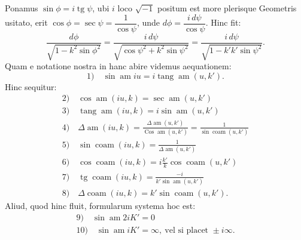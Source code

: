 \documentclass{article}
\begin{document}
Ponamus $\sin\phi=i\operatorname{tg}\psi$, ubi $i$ loco $\sqrt{-1}$ positum est more plerisque Geometris usitato, erit $\cos\phi=\sec\psi=\dfrac{1}{\cos\psi}$, unde $d\phi=\dfrac{i\,d\psi}{\cos\psi}$. Hinc fit:
\[
\frac{d\phi}{\sqrt{1-k^{2}\sin\phi^{2}}}=\frac{i\,d\psi}{\sqrt{\cos\psi^{2}+k^{2}\sin\psi^{2}}}=\frac{i\,d\psi}{\sqrt{1-k'k'\sin\psi^{2}}}.
\]
Quam e notatione nostra in hanc abire videmus aequationem:
\[
\text{1)}\quad\sin\operatorname{am}iu=i\operatorname{tang}\operatorname{am}(u,k').
\]
Hinc sequitur:
\[
\begin{gathered}
\text{2)}\quad\cos\operatorname{am}(iu,k)=\sec\operatorname{am}(u,k')\\
\text{3)}\quad\operatorname{tang}\operatorname{am}(iu,k)=i\sin\operatorname{am}(u,k')\\
\text{4)}\quad\Delta\operatorname{am}(iu,k)=\frac{\Delta\operatorname{am}(u,k')}{\operatorname{Cos}\operatorname{am}(u,k')}=\frac{1}{\sin\operatorname{coam}(u,k')}\\
\text{5)}\quad\sin\operatorname{coam}(iu,k)=\frac{1}{\Delta\operatorname{am}(u,k')}\\
\text{6)}\quad\cos\operatorname{coam}(iu,k)=i\frac{k'}{k}\cos\operatorname{coam}(u,k')\\
\text{7)}\quad\operatorname{tg}\operatorname{coam}(iu,k)=\frac{-i}{k'\sin\operatorname{am}(u,k')}\\
\text{8)}\quad\Delta\operatorname{coam}(iu,k)=k'\sin\operatorname{coam}(u,k').
\end{gathered}
\]
Aliud, quod hinc fluit, formularum systema hoc est:
\[
\begin{gathered}
\text{9)}\quad\sin\operatorname{am}2iK'=0\\
\text{10)}\quad\sin\operatorname{am}iK'=\infty,\ \text{vel si placet }\pm i\infty.
\end{gathered}
\]
\end{document}
